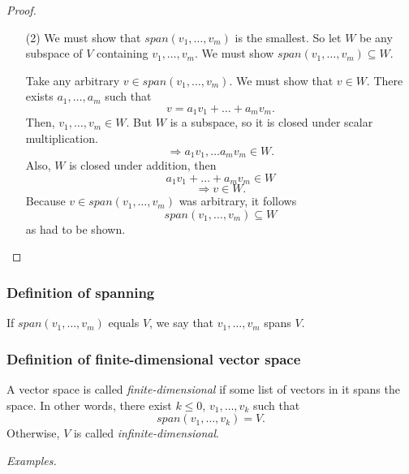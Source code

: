 \documentclass[11pt]{article}
\begin{document}
\begin{proof}
\begin{enumerate}
            \item[(2)] We must show that \(span(v_1, \dots,v_m)\) is the smallest. So let $W$ be any subspace of $V$ containing \(v_1, \dots, v_m.\) We must show \(span(v_1, \dots,v_m) \subseteq W.\) 
            
            Take any arbitrary \(v \in span(v_1, \dots, v_m).\) We must show that \(v \in W\). There exists \(a_1, \dots, a_m\) such that \[v = a_1 v_1 + \dots + a_m v_m.\] Then, \(v_1, \dots, v_m \in W.\) But $W$ is a subspace, so it is closed under scalar multiplication. \[\Rightarrow a_1 v_1, \dots a_m v_m \in W.\] Also, $W$ is closed under addition, then \[a_1 v_1 + \dots + a_m v_m \in W\] \[\Rightarrow v \in W.\] Because \(v \in span(v_1, \dots, v_m)\) was arbitrary, it follows \[span(v_1, \dots, v_m) \subseteq W\] as had to be shown.
        \end{enumerate}
    \end{proof}

    \pagebreak

    \subsubsection{Definition of spanning}

    If \(span(v_1, \dots, v_m)\) equals $V$, we say that \(v_1, \dots, v_m\) spans $V$.

    \subsubsection{Definition of finite-dimensional vector space}

    A vector space is called \emph{finite-dimensional} if some list of vectors in it spans the space. In other words, there exist \(k \leq 0\), \(v_1, \dots, v_k\) such that \[span(v_1, \dots, v_k) = V.\] Otherwise, $V$ is called \emph{infinite-dimensional}. 

    \vspace{1em}

    \emph{Examples.}
\end{document}
